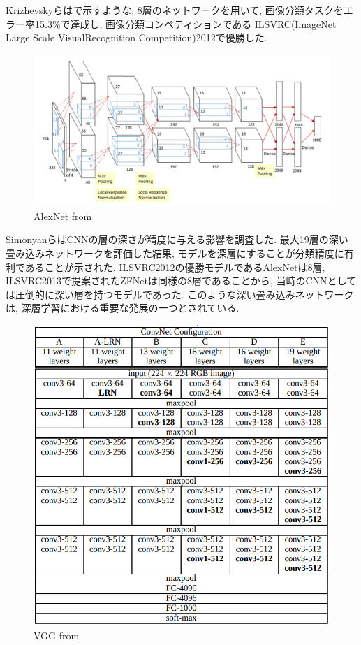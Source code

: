 Krizhevskyら\cite{AlexNet}はで示すような, 8層のネットワークを用いて, 画像分類タスクをエラー率15.3\%で達成し, 画像分類コンペティションである ILSVRC(ImageNet Large Scale VisualRecognition Competition)2012で優勝した.
\begin{figure}[hbtp]
  \centering
 \includegraphics[keepaspectratio, scale=0.55]
      {images/AlexNet.png}
 \caption{AlexNet from \cite{AlexNet}}
 \label{Fig:AlexNet}
\end{figure}
\newpage
SimonyanらはCNNの層の深さが精度に与える影響を調査した. 最大19層の深い畳み込みネットワークを評価した結果, モデルを深層にすることが分類精度に有利であることが示された.
ILSVRC2012の優勝モデルであるAlexNetは8層, ILSVRC2013で提案されたZFNetは同様の8層であることから, 当時のCNNとしては圧倒的に深い層を持つモデルであった. このような深い畳み込みネットワークは, 深層学習における重要な発展の一つとされている.
\begin{figure}[hbtp]
  \centering
 \includegraphics[keepaspectratio, scale=0.5]
      {images/VGG.png}
 \caption{VGG from \cite{AlexNet}}
 \label{Fig:VGG}
\end{figure}


